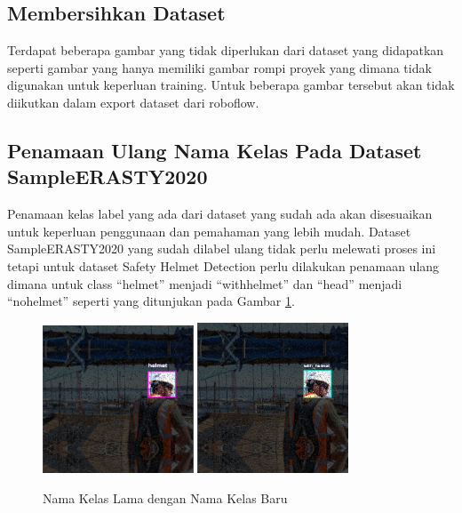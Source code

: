 \subsection{Membersihkan Dataset}
\par Terdapat beberapa gambar yang tidak diperlukan dari dataset yang didapatkan 
seperti gambar yang hanya memiliki gambar rompi proyek yang dimana tidak digunakan 
untuk keperluan training. Untuk beberapa gambar tersebut akan tidak diikutkan dalam 
export dataset dari roboflow.

\subsection{Penamaan Ulang Nama Kelas Pada Dataset SampleERASTY2020}
\par Penamaan kelas  label yang ada dari dataset yang sudah ada akan disesuaikan untuk 
keperluan penggunaan dan pemahaman yang lebih mudah. Dataset SampleERASTY2020 yang sudah dilabel 
ulang tidak perlu melewati proses ini tetapi untuk dataset Safety Helmet Detection perlu dilakukan 
penamaan ulang dimana untuk class “helmet” menjadi “with\textunderscore helmet” dan “head” 
menjadi “no\textunderscore helmet” seperti yang ditunjukan pada Gambar \ref{fig:prepro_classrename}. 

\begin{figure}[ht]
  \centering
  \includegraphics[width=0.4\textwidth]{gambar/reclass_old.png}
  \includegraphics[width=0.4\textwidth]{gambar/reclass_new.png}
  \caption{Nama Kelas Lama dengan Nama Kelas Baru}
  \label{fig:prepro_classrename}  
\end{figure}

